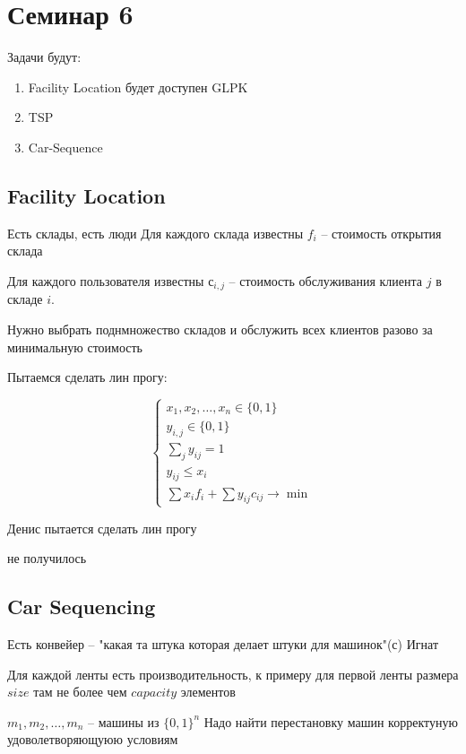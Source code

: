 \section{Семинар 6}

Задачи будут:
\begin{enumerate}
    \item Facility Location будет доступен GLPK
    \item TSP
    \item Car-Sequence
\end{enumerate}

\subsection{Facility Location}

Есть склады, есть люди
Для каждого склада известны $f_i$ -- стоимость открытия склада

Для каждого пользователя известны $с_{i, j}$ -- стоимость обслуживания 
клиента $j$ в складе $i$.

Нужно выбрать поднмножество складов и обслужить 
всех клиентов разово за минимальную стоимость

Пытаемся сделать лин прогу:

\[
    \begin{cases}
        x_1, x_2, \dots, x_n \in \{0, 1\}\\
        y_{i, j} \in \{0, 1\}\\
        \sum_{j} y_{i j} = 1\\
        y_{i j} \leq x_i\\
        \sum x_i f_i + \sum y_{i j} c_{i j} \to \min
    \end{cases}
\]

Денис пытается сделать лин прогу

не получилось


\subsection{Car Sequencing}

Есть конвейер -- "какая та штука которая делает штуки для машинок"(с) Игнат

Для каждой ленты есть производительность, к примеру 
для первой ленты размера $size$ там не более чем $capacity$ элементов

$m_1, m_2, \dots, m_n$ -- машины из $\{0, 1\}^n$
Надо найти перестановку машин корректуную удоволетворяющуюю условиям


